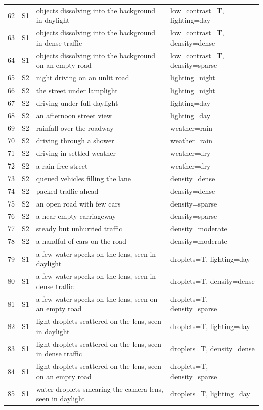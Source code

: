 \begin{longtable}{r l p{8.6cm} p{5.6cm}}
62 & S1 & objects dissolving into the background in daylight & low\_contrast=T, lighting=day\\
63 & S1 & objects dissolving into the background in dense traffic & low\_contrast=T, density=dense\\
64 & S1 & objects dissolving into the background on an empty road & low\_contrast=T, density=sparse\\
65 & S2 & night driving on an unlit road & lighting=night\\
66 & S2 & the street under lamplight & lighting=night\\
67 & S2 & driving under full daylight & lighting=day\\
68 & S2 & an afternoon street view & lighting=day\\
69 & S2 & rainfall over the roadway & weather=rain\\
70 & S2 & driving through a shower & weather=rain\\
71 & S2 & driving in settled weather & weather=dry\\
72 & S2 & a rain-free street & weather=dry\\
73 & S2 & queued vehicles filling the lane & density=dense\\
74 & S2 & packed traffic ahead & density=dense\\
75 & S2 & an open road with few cars & density=sparse\\
76 & S2 & a near-empty carriageway & density=sparse\\
77 & S2 & steady but unhurried traffic & density=moderate\\
78 & S2 & a handful of cars on the road & density=moderate\\
79 & S1 & a few water specks on the lens, seen in daylight & droplets=T, lighting=day\\
80 & S1 & a few water specks on the lens, seen in dense traffic & droplets=T, density=dense\\
81 & S1 & a few water specks on the lens, seen on an empty road & droplets=T, density=sparse\\
82 & S1 & light droplets scattered on the lens, seen in daylight & droplets=T, lighting=day\\
83 & S1 & light droplets scattered on the lens, seen in dense traffic & droplets=T, density=dense\\
84 & S1 & light droplets scattered on the lens, seen on an empty road & droplets=T, density=sparse\\
85 & S1 & water droplets smearing the camera lens, seen in daylight & droplets=T, lighting=day\\

\end{longtable}
